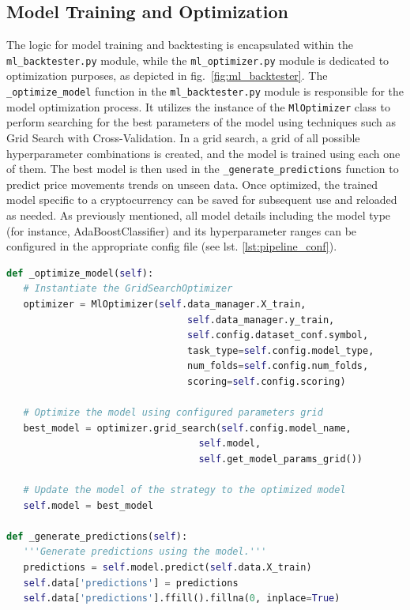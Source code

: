\subsection{Model Training and Optimization}
The logic for model training and backtesting is encapsulated within the \texttt{ml\_backtester.py} module,
while the \texttt{ml\_optimizer.py} module is dedicated to optimization purposes, as depicted in fig.~\ref{fig:ml_backtester}.
The \texttt{\_optimize\_model} function in the \texttt{ml\_backtester.py} module is responsible for the model optimization process.
It utilizes the instance of the  \texttt{MlOptimizer} class to perform searching for the best parameters of the model using techniques such as Grid Search with Cross-Validation.
In a grid search, a grid of all possible hyperparameter combinations is created, and the model is trained using each one of them.
The best model is then used in the \texttt{\_generate\_predictions} function to predict price movements trends on unseen data.
Once optimized, the trained model specific to a cryptocurrency can be saved for subsequent use and reloaded as needed.
As previously mentioned, all model details including the model type (for instance, AdaBoostClassifier) and its hyperparameter ranges can be configured in the appropriate config file (see lst. \ref{lst:pipeline_conf}).


\noindent\begin{minipage}{\linewidth}
\begin{lstlisting}[style=pythonstyle, language=Python, caption={Functions of MlBacktester class for model optimization and predictions.},  captionpos=b, label=lst:add_features_function]
def _optimize_model(self):
   # Instantiate the GridSearchOptimizer
   optimizer = MlOptimizer(self.data_manager.X_train,
                                self.data_manager.y_train,
                                self.config.dataset_conf.symbol,
                                task_type=self.config.model_type,
                                num_folds=self.config.num_folds,
                                scoring=self.config.scoring)

   # Optimize the model using configured parameters grid
   best_model = optimizer.grid_search(self.config.model_name,
                                  self.model,
                                  self.get_model_params_grid())

   # Update the model of the strategy to the optimized model
   self.model = best_model

def _generate_predictions(self):
   '''Generate predictions using the model.'''
   predictions = self.model.predict(self.data.X_train)
   self.data['predictions'] = predictions
   self.data['predictions'].ffill().fillna(0, inplace=True)

\end{lstlisting}
\end{minipage}


